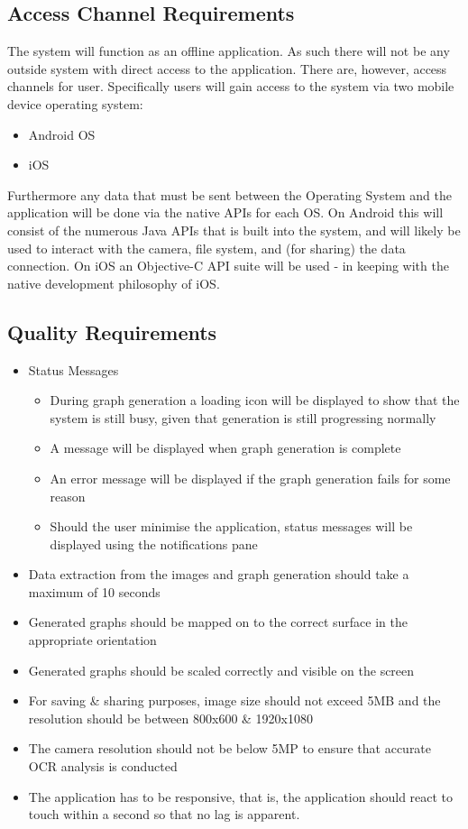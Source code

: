 \documentclass[a4paper,12pt]{article}
\begin{document}
\subsection{Access Channel Requirements}
The system will function as an offline application. As such there will not be any outside system with direct access to the application. There are, however, access channels for user. Specifically users will gain access to the system via two mobile device operating system:
\begin{itemize}
	\item Android OS
	\item iOS
\end{itemize}

Furthermore any data that must be sent between the Operating System and the application will be done via the native APIs for each OS. On Android this will consist of the numerous Java APIs that is built into the system, and will likely be used to interact with the camera, file system, and (for sharing) the data connection. On iOS an Objective-C API suite will be used - in keeping with the native development philosophy of iOS.
\subsection{Quality Requirements}

\begin{itemize}
	\item Status Messages
		\begin{itemize}
			\item During graph generation a loading icon will be displayed to show that the system is still busy, given that generation is still progressing normally
			\item A message will be displayed when graph generation is complete
			\item An error message will be displayed if the graph generation fails for some reason
			\item Should the user minimise the application, status messages will be displayed using the notifications pane
		\end{itemize}
		
	\item Data extraction from the images and graph generation should take a maximum of 10 seconds
	\item Generated graphs should be mapped on to the correct surface in the appropriate orientation
	\item Generated graphs should be scaled correctly and visible on the screen
\item For saving \& sharing purposes, image size should not exceed 5MB and the  resolution should be between 800x600 \& 1920x1080
	\item The camera resolution should not be below 5MP to ensure that accurate OCR analysis is conducted
	\item The application has to be responsive, that is, the application should react to touch within a second so that no lag is apparent.
\end{itemize}
\end{document}
